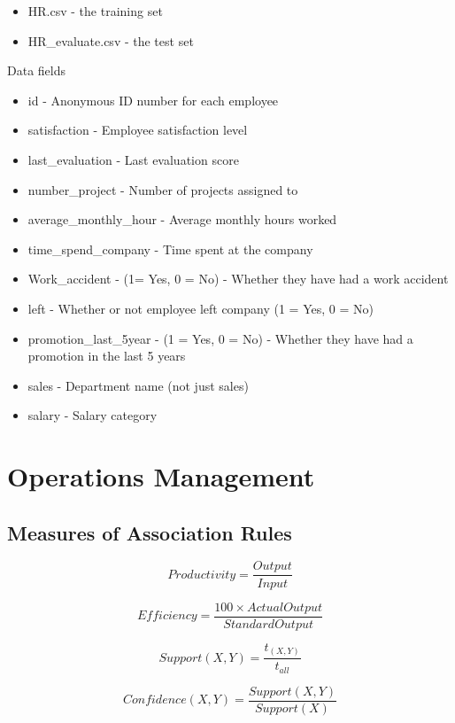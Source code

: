 \documentclass[]{book}
\providecommand{\tightlist}{%
  \setlength{\itemsep}{0pt}\setlength{\parskip}{0pt}}
\begin{document}
\begin{itemize}
\tightlist
\item
  HR.csv - the training set
\item
  HR\_evaluate.csv - the test set
\end{itemize}

Data fields

\begin{itemize}
\tightlist
\item
  id - Anonymous ID number for each employee
\item
  satisfaction - Employee satisfaction level
\item
  last\_evaluation - Last evaluation score
\item
  number\_project - Number of projects assigned to
\item
  average\_monthly\_hour - Average monthly hours worked
\item
  time\_spend\_company - Time spent at the company
\item
  Work\_accident - (1= Yes, 0 = No) - Whether they have had a work accident
\item
  left - Whether or not employee left company (1 = Yes, 0 = No)
\item
  promotion\_last\_5year - (1 = Yes, 0 = No) - Whether they have had a promotion in the last 5 years
\item
  sales - Department name (not just sales)
\item
  salary - Salary category
\end{itemize}

\hypertarget{operations-management}{%
\section{Operations Management}\label{operations-management}}

\hypertarget{measures-of-association-rules}{%
\subsection{Measures of Association Rules}\label{measures-of-association-rules}}

\[Productivity = \frac{Output}{Input} \]

\[Efficiency = \frac{100 \times ActualOutput}{StandardOutput}\]

\[Support(X,Y) = \frac{t_{(X,Y)}}{t_{all}}\]

\[Confidence(X,Y) = \frac{Support(X,Y)}{Support(X)} \]
\end{document}
